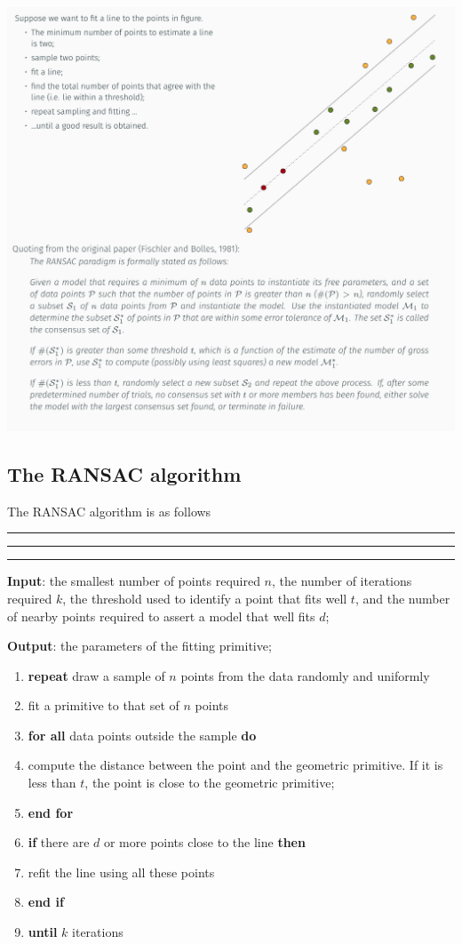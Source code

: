 \documentclass[10pt]{report}
\begin{document}
\begin{center}
\includegraphics[width=.9\linewidth]{./pics/fit/ransac.jpg}
\end{center}

\subsection{The RANSAC algorithm}
\label{the-ransac-algorithm}
The RANSAC algorithm is as follows

\vspace*{0.6cm}\hrule
\hrule
\hrule
\vspace*{0.4cm}

\textbf{Input}: the smallest number of points required \(n\), the number of
iterations required \(k\), the threshold used to identify a point that
fits well \(t\), and the number of nearby points required to assert a
model that well fits \(d\);

\textbf{Output}: the parameters of the fitting primitive;

\begin{enumerate}
\item \textbf{repeat} draw a sample of \(n\) points from the data randomly and
uniformly
\item fit a primitive to that set of \(n\) points
\item \textbf{for all} data points outside the sample \textbf{do}
\item compute the distance between the point and the geometric primitive.
If it is less than \(t\), the point is close to the geometric
primitive;
\item \textbf{end for}
\item \textbf{if} there are \(d\) or more points close to the line \textbf{then}
\item refit the line using all these points
\item \textbf{end if}
\item \textbf{until} \(k\) iterations
\end{enumerate}
\end{document}
